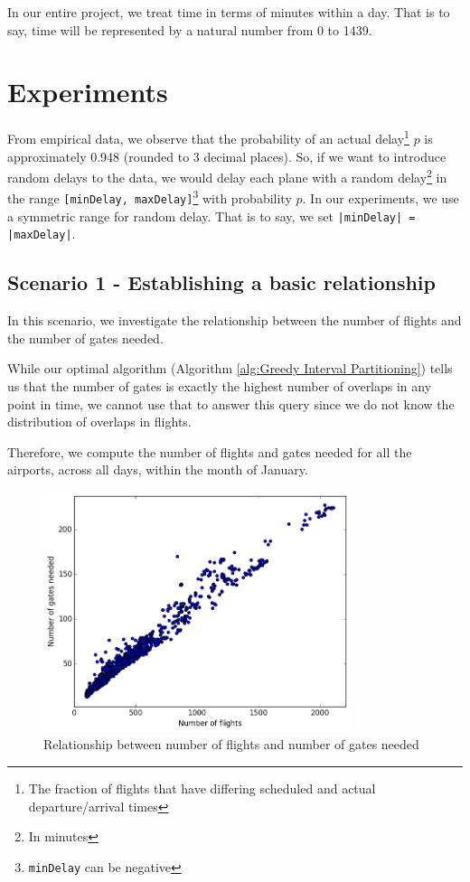 \documentclass[12pt, a4paper]{report}
\begin{document}
In our entire project, we treat time in terms of minutes within a day. That is to say, time will be represented by a natural number from 0 to 1439.

\section{Experiments}
\label{sec:Experiments}
From empirical data, we observe that the probability of an actual delay\footnote{The fraction of flights that have differing scheduled and actual departure/arrival times} $p$ is approximately 0.948 (rounded to 3 decimal places). So, if we want to introduce random delays to the data, we would delay each plane with a random delay\footnote{In minutes} in the range \texttt{[minDelay, maxDelay]}\footnote{\texttt{minDelay} can be negative} with probability $p$. In our experiments, we use a symmetric range for random delay. That is to say, we set \texttt{|minDelay| = |maxDelay|}.

\subsection{Scenario 1 - Establishing a basic relationship}
In this scenario, we investigate the relationship between the number of flights and the number of gates needed.

While our optimal algorithm (Algorithm \ref{alg:Greedy Interval Partitioning}) tells us that the number of gates is exactly the highest number of overlaps in any point in time, we cannot use that to answer this query since we do not know the distribution of overlaps in flights.

Therefore, we compute the number of flights and gates needed for all the airports, across all days, within the month of January.

\begin{figure}[h!]
\centering
\includegraphics[width=0.8\textwidth]{../graph/2b.png}
\caption{Relationship between number of flights and number of gates needed}
\end{figure}
\end{document}
